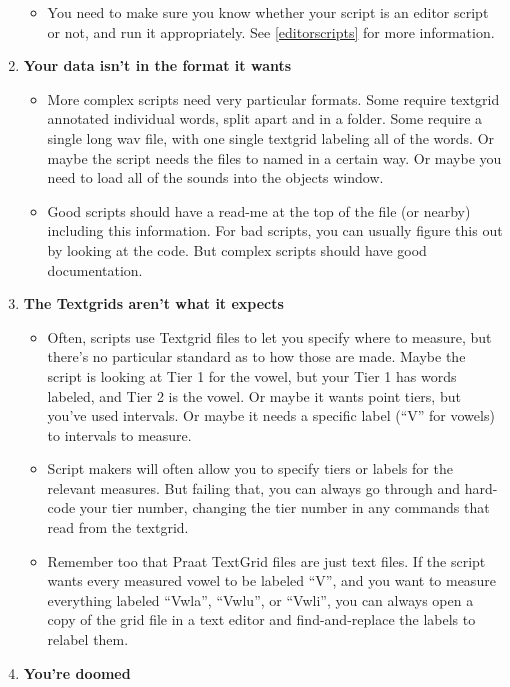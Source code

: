 \begin{enumerate}
  \begin{itemize}
  \tightlist
  \item
    You need to make sure you know whether your script is an editor
    script or not, and run it appropriately. See \ref{editorscripts} for
    more information.
  \end{itemize}
\item
  \textbf{Your data isn't in the format it wants}

  \begin{itemize}
  \tightlist
  \item
    More complex scripts need very particular formats. Some require
    textgrid annotated individual words, split apart and in a folder.
    Some require a single long wav file, with one single textgrid
    labeling all of the words. Or maybe the script needs the files to
    named in a certain way. Or maybe you need to load all of the sounds
    into the objects window.
  \item
    Good scripts should have a read-me at the top of the file (or
    nearby) including this information. For bad scripts, you can usually
    figure this out by looking at the code. But complex scripts should
    have good documentation.
  \end{itemize}
\item
  \textbf{The Textgrids aren't what it expects}

  \begin{itemize}
  \tightlist
  \item
    Often, scripts use Textgrid files to let you specify where to
    measure, but there's no particular standard as to how those are
    made. Maybe the script is looking at Tier 1 for the vowel, but your
    Tier 1 has words labeled, and Tier 2 is the vowel. Or maybe it wants
    point tiers, but you've used intervals. Or maybe it needs a specific
    label (``V'' for vowels) to intervals to measure.
  \item
    Script makers will often allow you to specify tiers or labels for
    the relevant measures. But failing that, you can always go through
    and hard-code your tier number, changing the tier number in any
    commands that read from the textgrid.
  \item
    Remember too that Praat TextGrid files are just text files. If the
    script wants every measured vowel to be labeled ``V'', and you want
    to measure everything labeled ``Vwla'', ``Vwlu'', or ``Vwli'', you
    can always open a copy of the grid file in a text editor and
    find-and-replace the labels to relabel them.
  \end{itemize}
\item
  \textbf{You're doomed}


\end{enumerate}
